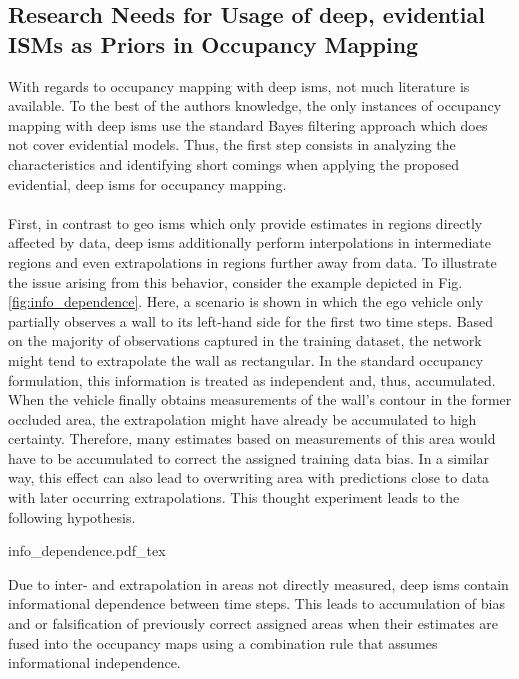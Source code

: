 \subsection{Research Needs for Usage of deep, evidential ISMs as Priors in Occupancy Mapping}
\label{subsec:research_needs_for_usage_of_deep_ims_as_priors_in_occmapping}
With regards to occupancy mapping with deep \gls{ism}s, not much literature is available. To the best of the authors knowledge, the only instances of occupancy mapping with deep \gls{ism}s use the standard Bayes filtering approach which does not cover evidential models. Thus, the first step consists in analyzing the characteristics and identifying short comings when applying the proposed evidential, deep \gls{ism}s for occupancy mapping.
\\\\
First, in contrast to geo \gls{ism}s which only provide estimates in regions directly affected by data, deep \gls{ism}s additionally perform interpolations in intermediate regions and even extrapolations in regions further away from data. To illustrate the issue arising from this behavior, consider the example depicted in Fig. \ref{fig:info_dependence}. Here, a scenario is shown in which the ego vehicle only partially observes a wall to its left-hand side for the first two time steps. Based on the majority of observations captured in the training dataset, the network might tend to extrapolate the wall as rectangular. In the standard occupancy formulation, this information is treated as independent and, thus, accumulated. When the vehicle finally obtains measurements of the wall's contour in the former occluded area, the extrapolation might have already be accumulated to high certainty. Therefore, many estimates based on measurements of this area would have to be accumulated to correct the assigned training data bias. In a similar way, this effect can also lead to overwriting area with predictions close to data with later occurring extrapolations. This thought experiment leads to the following hypothesis.
\begin{center}
	{info_dependence.pdf_tex}
\end{center}
\begin{hyp} \label{hyp:temporal_dependence}
	Due to inter- and extrapolation in areas not directly measured, deep \gls{ism}s contain informational dependence between time steps. This leads to accumulation of bias and or falsification of previously correct assigned areas when their estimates are fused into the occupancy maps using a combination rule that assumes informational independence.  
\end{hyp} 
